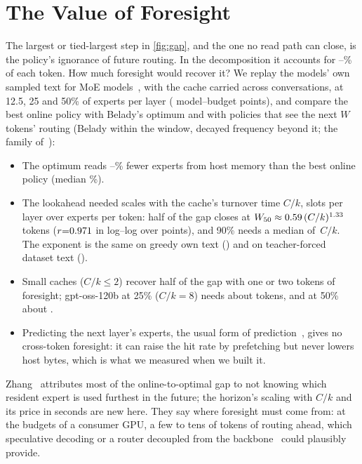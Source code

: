 \documentclass[10pt,twocolumn]{article}
\begin{document}
\section{The Value of Foresight}\label{sec:foresight}
The largest or tied-largest step in \cref{fig:gap}, and the one no read path can close, is the policy's ignorance of future routing.
In the decomposition it accounts for \gapFsMin--\gapFsMax\% of each token. How much foresight would recover it? We replay the models' own sampled text for \fsModels{} MoE
models~\cite{muennighoff2024olmoe,yang2025qwen3,openai2025gptoss}, with the cache carried across conversations, at
12.5, 25 and 50\% of experts per layer (\fsPoints{} model--budget points), and compare the best online policy with
Belady's optimum and with policies that see the next $W$ tokens' routing (Belady within the window, decayed frequency
beyond it; the family of~\cite{hasslinger2018}):
\begin{itemize}\setlength\itemsep{1pt}
\item The optimum reads \fsSaveMin--\fsSaveMax\% fewer experts from host memory than the best online policy (median
\fsSaveMed\%).
\item The lookahead needed scales with the cache's turnover time $C/k$, slots per layer over experts per token: half
of the gap closes at $W_{50}\approx0.59\,(C/k)^{1.33}$ tokens ($r{=}0.971$ in log--log over \fsFitN{} points), and
90\% needs a median of \fsNinety$\,C/k$. The exponent is the same on greedy own text (\fsExpG) and on teacher-forced
dataset text (\fsExpD).
\item Small caches ($C/k\le2$) recover half of the gap with one or two tokens of foresight; gpt-oss-120b at 25\%
($C/k{=}8$) needs about \fsGptQuarter{} tokens, and at 50\% about \fsGptHalf.
\item Predicting the next layer's experts, the usual form of prediction~\cite{hwang2024pregated,zhu2025preattention},
gives no cross-token foresight: it can raise the hit rate by prefetching but never lowers host bytes, which is what we
measured when we built it.
\end{itemize}
Zhang~\cite{zhang2026reproducible} attributes most of the online-to-optimal gap to not knowing which resident expert
is used furthest in the future; the horizon's scaling with $C/k$ and its price in seconds are new here. They say where
foresight must come from: at the budgets of a consumer GPU, a few to tens of tokens of routing ahead, which
speculative decoding or a router decoupled from the backbone~\cite{readme2024} could plausibly provide.
\end{document}
